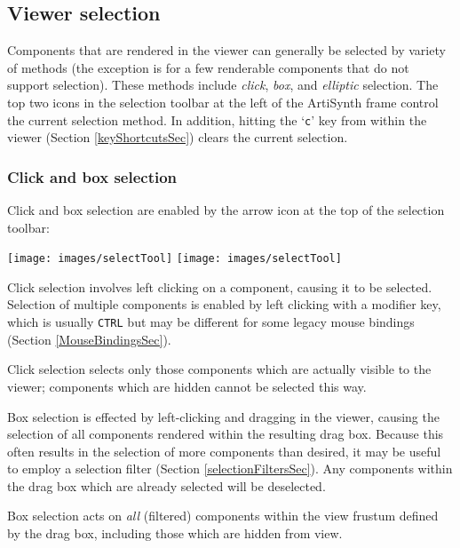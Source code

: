 \documentclass{article}
\begin{document}
\subsection{Viewer selection}
\label{viewerSelectionSec}

Components that are rendered in the viewer can generally be selected
by variety of methods (the exception is for a few renderable
components that do not support selection). These methods include {\it click},
{\it box}, and {\it elliptic} selection. The top two icons in the
selection toolbar at the left of the ArtiSynth frame control the
current selection method. In addition, hitting the `{\tt c}' key
from within the viewer
(Section \ref{keyShortcutsSec}) clears the current selection.

\subsubsection{Click and box selection}
\label{clickAndBoxSelection:sec}

Click and box selection are enabled by the arrow icon at the top of
the selection toolbar:

\vspace{\parskip}
\iflatexml
\texttt{[image: images/selectTool]}
\else
\texttt{[image: images/selectTool]}
\fi

Click selection involves left clicking on a component, causing it to
be selected. Selection of multiple components is enabled by left
clicking with a modifier key, which is usually {\tt CTRL}
but may be different for some legacy mouse bindings 
(Section \ref{MouseBindingsSec}).

\begin{sideblock}
Click selection selects only those components which are actually
visible to the viewer; components which are hidden cannot be selected
this way.
\end{sideblock}

Box selection is effected by left-clicking and dragging in the viewer,
causing the selection of all components rendered within the resulting
drag box. Because this often results in the selection of more
components than desired, it may be useful to employ a selection filter
(Section \ref{selectionFiltersSec}). Any components within the drag
box which are already selected will be deselected.

\begin{sideblock}
Box selection acts on {\it all} (filtered) components within the view
frustum defined by the drag box, including those which are hidden
from view.
\end{sideblock}
\end{document}
